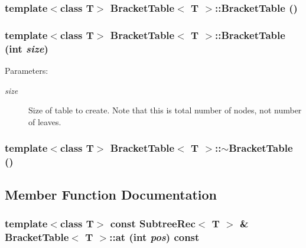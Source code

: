 \subsubsection{\setlength{\rightskip}{0pt plus 5cm}template$<$class T$>$ {\bf Bracket\-Table}$<$ T $>$::{\bf Bracket\-Table} ()}\label{classBracketTable_a0}


\subsubsection{\setlength{\rightskip}{0pt plus 5cm}template$<$class T$>$ {\bf Bracket\-Table}$<$ T $>$::{\bf Bracket\-Table} (int {\em size})}\label{classBracketTable_a1}


\begin{Desc}
\item[Parameters:]
\begin{description}
\item[{\em size}]Size of table to create. Note that this is total number of nodes, not number of leaves. \end{description}
\end{Desc}
\subsubsection{\setlength{\rightskip}{0pt plus 5cm}template$<$class T$>$ {\bf Bracket\-Table}$<$ T $>$::$\sim${\bf Bracket\-Table} ()}\label{classBracketTable_a2}




\subsection{Member Function Documentation}
\subsubsection{\setlength{\rightskip}{0pt plus 5cm}template$<$class T$>$ const {\bf Subtree\-Rec}$<$ T $>$ \& {\bf Bracket\-Table}$<$ T $>$::at (int {\em pos}) const\hspace{0.3cm}{\tt  [inline]}}\label{classBracketTable_a10}


